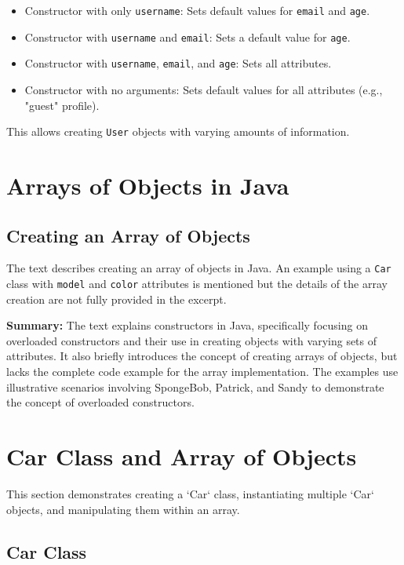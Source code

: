 \documentclass{article}
\begin{document}
\begin{itemize}
    \item Constructor with only \texttt{username}: Sets default values for \texttt{email} and \texttt{age}.
    \item Constructor with \texttt{username} and \texttt{email}: Sets a default value for \texttt{age}.
    \item Constructor with \texttt{username}, \texttt{email}, and \texttt{age}: Sets all attributes.
    \item Constructor with no arguments: Sets default values for all attributes (e.g., "guest" profile).
\end{itemize}

This allows creating \texttt{User} objects with varying amounts of information.


\section{Arrays of Objects in Java}

\subsection{Creating an Array of Objects}

The text describes creating an array of objects in Java. An example using a \texttt{Car} class with \texttt{model} and \texttt{color} attributes is mentioned but the details of the array creation are not fully provided in the excerpt.


\textbf{Summary:} The text explains constructors in Java, specifically focusing on overloaded constructors and their use in creating objects with varying sets of attributes. It also briefly introduces the concept of creating arrays of objects, but lacks the complete code example for the array implementation.  The examples use illustrative scenarios involving SpongeBob, Patrick, and Sandy to demonstrate the concept of overloaded constructors.


\section{Car Class and Array of Objects}

This section demonstrates creating a `Car` class, instantiating multiple `Car` objects, and manipulating them within an array.

\subsection{Car Class}
\end{document}
